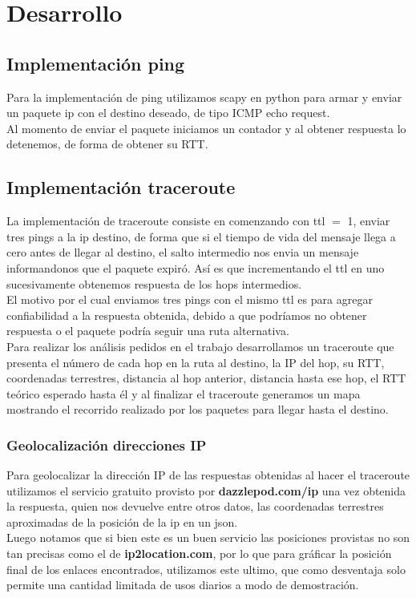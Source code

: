 \section{Desarrollo}

\subsection{Implementación ping}

Para la implementación de ping utilizamos scapy en python para armar y enviar un paquete ip con el destino deseado, de tipo ICMP echo request.	\\
Al momento de enviar el paquete iniciamos un contador y al obtener respuesta lo detenemos, de forma de obtener su RTT.

\subsection{Implementación traceroute}

La implementación de traceroute consiste en comenzando con ttl $=$ 1, enviar tres pings a la ip destino, de forma que si el tiempo de vida del mensaje llega a cero antes de llegar al destino, el salto intermedio nos envia un mensaje informandonos que el paquete expiró. Así es que incrementando el ttl en uno sucesivamente obtenemos respuesta de los hops intermedios.	\\
El motivo por el cual enviamos tres pings con el mismo ttl es para agregar confiabilidad a la respuesta obtenida, debido a que podríamos no obtener respuesta o el paquete podría seguir una ruta alternativa.	\\
Para realizar los análisis pedidos en el trabajo desarrollamos un traceroute que presenta el número de cada hop en la ruta al destino, la IP del hop, su RTT, coordenadas terrestres, distancia al hop anterior, distancia hasta ese hop, el RTT teórico esperado hasta él y al finalizar el traceroute generamos un mapa mostrando el recorrido realizado por los paquetes para llegar hasta el destino.

\subsubsection{Geolocalización direcciones IP}

Para geolocalizar la dirección IP de las respuestas obtenidas al hacer el traceroute utilizamos el servicio gratuito provisto por \textbf{dazzlepod.com/ip} una vez obtenida la respuesta, quien nos devuelve entre otros datos, las coordenadas terrestres aproximadas de la posición de la ip en un json.	\\
Luego notamos que si bien este es un buen servicio las posiciones provistas no son tan precisas como el de \textbf{ip2location.com}, por lo que para gráficar la posición final de los enlaces encontrados, utilizamos este ultimo, que como desventaja solo permite una cantidad limitada de usos diarios a modo de demostración.


